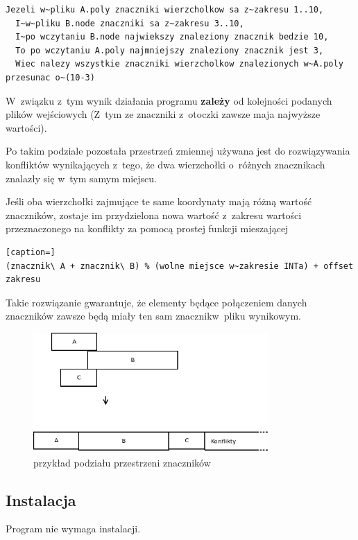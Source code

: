 \documentclass[a4paper]{article} \usepackage{setspace}
\begin{document}
\begin{lstlisting}[caption=Przykład]
  Jezeli w~pliku A.poly znaczniki wierzcholkow sa z~zakresu 1..10,
  I~w~pliku B.node znaczniki sa z~zakresu 3..10,
  I~po wczytaniu B.node najwiekszy znaleziony znacznik bedzie 10,
  To po wczytaniu A.poly najmniejszy znaleziony znacznik jest 3,
  Wiec nalezy wszystkie znaczniki wierzcholkow znalezionych w~A.poly przesunac o~(10-3)
\end{lstlisting}

W~związku z~tym wynik działania programu \textbf{zależy} od kolejności podanych plików wejściowych
(Z~tym ze znaczniki z~otoczki zawsze maja najwyższe wartości).

Po takim podziale pozostała przestrzeń zmiennej używana jest do rozwiązywania konfliktów wynikających z~tego, że dwa wierzchołki o~różnych znacznikach znalazły się w~tym samym miejscu.

Jeśli oba wierzchołki zajmujące te same koordynaty mają różną wartość znaczników, zostaje im przydzielona nowa wartość z~zakresu wartości przeznaczonego na konflikty za pomocą prostej funkcji mieszającej

\begin{lstlisting}[caption=]
(znacznik\ A + znacznik\ B) % (wolne miejsce w~zakresie INTa) + offset zakresu
\end{lstlisting}

Takie rozwiązanie gwarantuje, że elementy będące połączeniem danych znaczników zawsze będą miały ten sam znacznikw~pliku wynikowym.

\begin{figure}[h]
  \centering
  \includegraphics[width=0.8\textwidth]{konflikty.png}
  \caption{przykład podziału przestrzeni znaczników}
\end{figure}
\newpage
\subsection{Instalacja}
Program nie wymaga instalacji.
\end{document}
